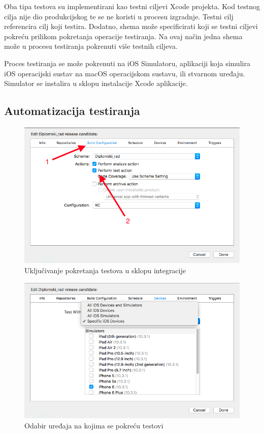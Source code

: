 \documentclass[times, utf8, diplomski, numeric]{fer}
\begin{document}
Oba tipa testova su implementirani kao testni ciljevi Xcode projekta. Kod testnog cilja nije dio produkcijskog te se ne koristi u procesu izgradnje. Testni cilj referencira cilj koji testira. Dodatno, shema može specificirati koji se testni ciljevi pokreću prilikom pokretanja operacije testiranja. Na ovaj način jedna shema može u procesu testiranja pokrenuti više testnih ciljeva.

Proces testiranja se može pokrenuti na iOS Simulatoru, aplikaciji koja simulira iOS operacijski sustav na macOS operacijskom sustavu, ili stvarnom uređaju. Simulator se instalira u sklopu instalacije Xcode aplikacije.

\subsection{Automatizacija testiranja}

\begin{figure}[b!]
\centering
\includegraphics[scale=0.5]{XcodeServerTestAction}
\caption{Uključivanje pokretanja testova u sklopu integracije}
\label{fig:XcodeServerTestAction}
\end{figure}

\begin{figure}
\centering
\includegraphics[scale=0.5]{XcodeServerTestDevices}
\caption{Odabir uređaja na kojima se pokreću testovi}
\label{fig:XcodeServerTestDevices}
\end{figure}
\end{document}

